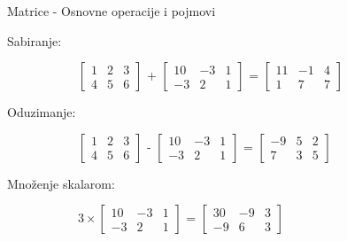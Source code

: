 \documentclass[bookmarks=true,bookmarksopen=true,pdfborder={0 0 0},pdfhighlight={/N},linkbordercolor={.5 .5 .5},implicit=false,unicode,xcolor={table}]{beamer}
\begin{document}
\begin{frame}{Matrice - Osnovne operacije i pojmovi}

  Sabiranje:
  \begin{figure}
    \begin{subfigure}{9cm}
      $\begin{bmatrix}
        1 & 2 & 3\\
        4 & 5 & 6
        \end{bmatrix}$
      + 
      $\begin{bmatrix}
        10 & -3 & 1\\
        -3 & 2 & 1
        \end{bmatrix}$
      =
      $\begin{bmatrix}
        11 & -1 & 4\\
        1 & 7 & 7
        \end{bmatrix}$
    \end{subfigure}
  \end{figure}

  Oduzimanje:
  \begin{figure}
    \begin{subfigure}{9cm}
      $\begin{bmatrix}
        1 & 2 & 3\\
        4 & 5 & 6
        \end{bmatrix}$
      - 
      $\begin{bmatrix}
        10 & -3 & 1\\
        -3 & 2 & 1
        \end{bmatrix}$
      =
      $\begin{bmatrix}
        -9 & 5 & 2\\
        7 & 3 & 5
        \end{bmatrix}$
    \end{subfigure}
  \end{figure}

  Množenje skalarom:
  \begin{figure}
    \begin{subfigure}{9cm}
      
      $
      3\times
      \begin{bmatrix}
        10 & -3 & 1\\
        -3 & 2 & 1
        \end{bmatrix}$
      =
      $\begin{bmatrix}
        30 & -9 & 3\\
        -9 & 6 & 3
        \end{bmatrix}$
    \end{subfigure}
  \end{figure}

\end{frame}
\end{document}
